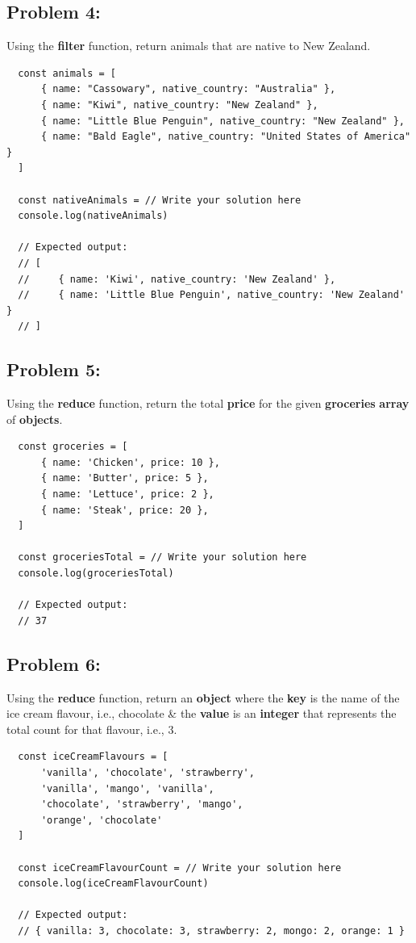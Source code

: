 \documentclass{article}
\begin{document}
\subsection*{Problem 4:} 
Using the \textbf{filter} function, return animals that are native to New Zealand.

\begin{verbatim}
  const animals = [
      { name: "Cassowary", native_country: "Australia" },
      { name: "Kiwi", native_country: "New Zealand" },
      { name: "Little Blue Penguin", native_country: "New Zealand" },
      { name: "Bald Eagle", native_country: "United States of America" }
  ]

  const nativeAnimals = // Write your solution here
  console.log(nativeAnimals)

  // Expected output:
  // [
  //     { name: 'Kiwi', native_country: 'New Zealand' },
  //     { name: 'Little Blue Penguin', native_country: 'New Zealand' }
  // ]
\end{verbatim} 

\subsection*{Problem 5:} 
Using the \textbf{reduce} function, return the total \textbf{price} for the given \textbf{groceries} \textbf{array} of \textbf{objects}.

\begin{verbatim}
  const groceries = [
      { name: 'Chicken', price: 10 },
      { name: 'Butter', price: 5 },
      { name: 'Lettuce', price: 2 },
      { name: 'Steak', price: 20 },
  ]

  const groceriesTotal = // Write your solution here
  console.log(groceriesTotal)

  // Expected output:
  // 37
\end{verbatim}

\subsection*{Problem 6:} 
Using the \textbf{reduce} function, return an \textbf{object} where the \textbf{key} is the name of the ice cream flavour, i.e., chocolate \& the \textbf{value} is an \textbf{integer} that represents the total count for that flavour, i.e., 3. 

\begin{verbatim}
  const iceCreamFlavours = [
      'vanilla', 'chocolate', 'strawberry', 
      'vanilla', 'mango', 'vanilla', 
      'chocolate', 'strawberry', 'mango', 
      'orange', 'chocolate'
  ]

  const iceCreamFlavourCount = // Write your solution here
  console.log(iceCreamFlavourCount)

  // Expected output:
  // { vanilla: 3, chocolate: 3, strawberry: 2, mongo: 2, orange: 1 }
\end{verbatim}
\end{document}
